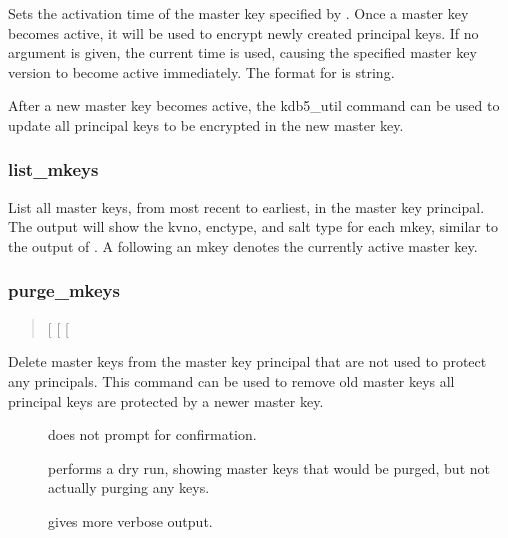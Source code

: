 \documentclass[letterpaper,10pt,english]{sphinxmanual}
\begin{document}
\sphinxAtStartPar
Sets the activation time of the master key specified by .
Once a master key becomes active, it will be used to encrypt newly
created principal keys.  If no  argument is given, the current
time is used, causing the specified master key version to become
active immediately.  The format for  is  string.

\sphinxAtStartPar
After a new master key becomes active, the kdb5\_util
 command can be used to update all
principal keys to be encrypted in the new master key.


\subsubsection{list\_mkeys}
\label{\detokenize{admin/admin_commands/kdb5_util:list-mkeys}}\begin{quote}

\sphinxAtStartPar
{}
\end{quote}

\sphinxAtStartPar
List all master keys, from most recent to earliest, in the master key
principal.  The output will show the kvno, enctype, and salt type for
each mkey, similar to the output of {\hyperref[\detokenize{admin/admin_commands/kadmin_local:kadmin-1}]{}} .  A
\sphinxcode{\sphinxupquote{*}} following an mkey denotes the currently active master key.


\subsubsection{purge\_mkeys}
\label{\detokenize{admin/admin_commands/kdb5_util:purge-mkeys}}\begin{quote}

\sphinxAtStartPar
{} {[}\sphinxstylestrong{\sphinxhyphen{}f}{]} {[}\sphinxstylestrong{\sphinxhyphen{}n}{]} {[}\sphinxstylestrong{\sphinxhyphen{}v}{]}
\end{quote}

\sphinxAtStartPar
Delete master keys from the master key principal that are not used to
protect any principals.  This command can be used to remove old master
keys all principal keys are protected by a newer master key.
\begin{description}
\item[{}] \leavevmode
\sphinxAtStartPar
does not prompt for confirmation.

\item[{}] \leavevmode
\sphinxAtStartPar
performs a dry run, showing master keys that would be purged, but
not actually purging any keys.

\item[{}] \leavevmode
\sphinxAtStartPar
gives more verbose output.

\end{description}
\end{document}
